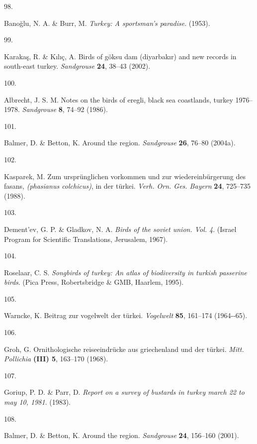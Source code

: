 \documentclass[
  letterpaper,
  DIV=11,
  numbers=noendperiod]{scrreprt}
\newlength{\cslhangindent}
\newlength{\csllabelwidth}
\newenvironment{CSLReferences}[2] %
 {\begin{list}{}{%
  \setlength{\itemindent}{0pt}
  \setlength{\leftmargin}{0pt}
  \setlength{\parsep}{0pt}
  \ifodd #1
   \setlength{\leftmargin}{\cslhangindent}
   \setlength{\itemindent}{-1\cslhangindent}
  \fi
  \setlength{\itemsep}{#2\baselineskip}}}
 {\end{list}}
\newcommand{\CSLLeftMargin}[1]{\parbox[t]{\csllabelwidth}{\strut#1\strut}}
\newcommand{\CSLRightInline}[1]{\parbox[t]{\linewidth - \csllabelwidth}{\strut#1\strut}}
\begin{document}
\begin{CSLReferences}{0}{0}
\CSLLeftMargin{98. }%
\CSLRightInline{Banoğlu, N. A. \& Burr, M. \emph{Turkey: A sportsman's
paradise}. (1953).}

\CSLLeftMargin{99. }%
\CSLRightInline{Karakaş, R. \& Kılıç, A. Birds of göksu dam (diyarbakır)
and new records in south-east turkey. \emph{Sandgrouse} \textbf{24},
38--43 (2002).}

\CSLLeftMargin{100. }%
\CSLRightInline{Albrecht, J. S. M. Notes on the birds of eregli, black
sea coastlands, turkey 1976--1978. \emph{Sandgrouse} \textbf{8}, 74--92
(1986).}

\CSLLeftMargin{101. }%
\CSLRightInline{Balmer, D. \& Betton, K. Around the region.
\emph{Sandgrouse} \textbf{26}, 76--80 (2004a).}

\CSLLeftMargin{102. }%
\CSLRightInline{Kasparek, M. Zum ursprünglichen vorkommen und zur
wiedereinbürgerung des fasans, \emph{(phasianus colchicus)}, in der
türkei. \emph{Verh. Orn. Ges. Bayern} \textbf{24}, 725--735 (1988).}

\CSLLeftMargin{103. }%
\CSLRightInline{Dement'ev, G. P. \& Gladkov, N. A. \emph{Birds of the
soviet union. Vol. 4}. (Israel Program for Scientific Translations,
Jerusalem, 1967).}

\CSLLeftMargin{104. }%
\CSLRightInline{Roselaar, C. S. \emph{Songbirds of turkey: An atlas of
biodiversity in turkish passerine birds}. (Pica Press, Robertsbridge \&
GMB, Haarlem, 1995).}

\CSLLeftMargin{105. }%
\CSLRightInline{Warncke, K. Beitrag zur vogelwelt der türkei.
\emph{Vogelwelt} \textbf{85}, 161--174 (1964-\/-65).}

\CSLLeftMargin{106. }%
\CSLRightInline{Groh, G. Ornithologische reiseeindrücke aus griechenland
und der türkei. \emph{Mitt. Pollichia} \textbf{(III) 5}, 163--170
(1968).}

\CSLLeftMargin{107. }%
\CSLRightInline{Goriup, P. D. \& Parr, D. \emph{Report on a survey of
bustards in turkey march 22 to may 10, 1981}. (1983).}

\CSLLeftMargin{108. }%
\CSLRightInline{Balmer, D. \& Betton, K. Around the region.
\emph{Sandgrouse} \textbf{24}, 156--160 (2001).}


\end{CSLReferences}
\end{document}
